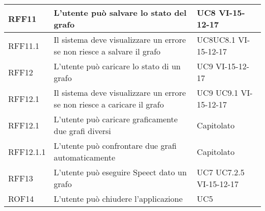\documentclass[../AnalisideiRequisiti.tex]{subfiles}
\begin{document}
\begin{longtable}{| p{3cm} | p{6cm} | p{3cm} |}
		
	
		
		\newline RFF11&
		\newline L'utente può salvare lo stato del grafo&
		\newline UC8 \newline VI-15-12-17 
		\\[1em]
		\hline
		\newline RFF11.1&
		\newline Il sistema deve visualizzare un errore se non riesce a salvare il grafo&
		\newline UC8\newline UC8.1 \newline VI-15-12-17 
		\\[1em]
		\hline
		
		\newline RFF12&
		\newline L'utente può caricare lo stato di un grafo&
		\newline UC9 \newline VI-15-12-17
		\\[1em]
		\hline
				\newline RFF12.1&
		\newline Il sistema deve visualizzare un errore se non riesce a caricare il grafo&
		\newline UC9 \newline UC9.1 \newline VI-15-12-17 
		\\[1em]
		\hline
			\newline RFF12.1&
		\newline L'utente può caricare  graficamente due grafi diversi&
		\newline Capitolato
		\\[1em]
		\hline
		
			\newline RFF12.1.1&
		\newline L'utente può confrontare due grafi automaticamente&
		\newline Capitolato
		\\[1em]
		\hline
		
		
		\newline RFF13&
		\newline L'utente può eseguire Speect dato un grafo&
		\newline UC7 \newline UC7.2.5 \newline VI-15-12-17
		\\[1em]
		\hline
		
	
		
		\newline ROF14&
		\newline L'utente può chiudere l'applicazione&
		\newline UC5
		\\[1em]
		\hline
		
		
	\end{longtable}
\end{document}

